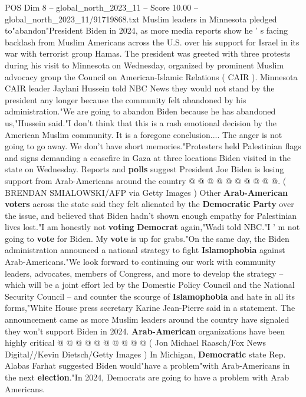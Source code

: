 \begin{textsample}{POS Dim 8 – global\_north\_2023\_11 – Score 10.00 – global\_north\_2023\_11/91719868.txt}  \label{ex:f8_pos_128}
Muslim leaders in Minnesota pledged to"abandon"President Biden in 2024, as more media reports show he ' s facing backlash from Muslim Americans across the U.S. over his support for Israel in its war with terrorist group Hamas.
The president was greeted with three protests during his visit to Minnesota on Wednesday, organized by prominent Muslim advocacy group the Council on American-Islamic Relations ( CAIR ).
Minnesota CAIR leader Jaylani Hussein told NBC News they would not stand by the president any longer because the community felt abandoned by his administration."We are going to abandon Biden because he has abandoned us,"Hussein said."I don't think that this is a rash emotional decision by the American Muslim community.
It is a foregone conclusion....
The anger is not going to go away.
We don't have short memories."Protesters held Palestinian flags and signs demanding a ceasefire in Gaza at three locations Biden visited in the state on Wednesday.
Reports and \textbf{polls} suggest President Joe Biden is losing support from Arab-Americans around the country @ @ @ @ @ @ @ @ @ @. ( BRENDAN SMIALOWSKI/AFP via Getty Images ) Other \textbf{Arab-American} \textbf{voters} across the state said they felt alienated by the \textbf{Democratic} \textbf{Party} over the issue, and believed that Biden hadn't shown enough empathy for Palestinian lives lost."I am honestly not \textbf{voting} \textbf{Democrat} again,"Wadi told NBC."I ' m not going to \textbf{vote} for Biden.
My \textbf{vote} is up for grabs."On the same day, the Biden administration announced a national strategy to fight \textbf{Islamophobia} against Arab-Americans."We look forward to continuing our work with community leaders, advocates, members of Congress, and more to develop the strategy -- which will be a joint effort led by the Domestic Policy Council and the National Security Council -- and counter the scourge of \textbf{Islamophobia} and hate in all its forms,"White House press secretary Karine Jean-Pierre said in a statement.
The announcement came as more Muslim leaders around the country have signaled they won't support Biden in 2024. \textbf{Arab-American} organizations have been highly critical @ @ @ @ @ @ @ @ @ @ ( Jon Michael Raasch/Fox News Digital//Kevin Dietsch/Getty Images ) In Michigan, \textbf{Democratic} state Rep.
Alabas Farhat suggested Biden would"have a problem"with Arab-Americans in the next \textbf{election}."In 2024, Democrats are going to have a problem with Arab Americans.

\end{textsample}
